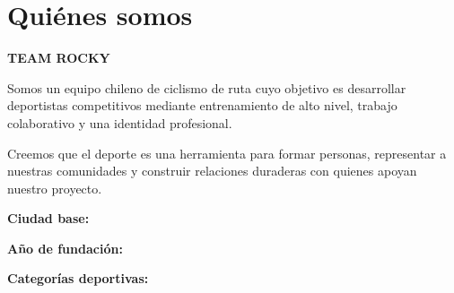 \section{Quiénes somos}

{\fontsize{30}{34}\selectfont\bfseries TEAM ROCKY\par}

Somos un equipo chileno de ciclismo de ruta cuyo objetivo es desarrollar
deportistas competitivos mediante entrenamiento de alto nivel, trabajo
colaborativo y una identidad profesional.

Creemos que el deporte es una herramienta para formar personas, representar
a nuestras comunidades y construir relaciones duraderas con quienes apoyan
nuestro proyecto.



\textbf{Ciudad base:} \dato

\textbf{Año de fundación:} \dato

\textbf{Categorías deportivas:} \dato
\newpage

